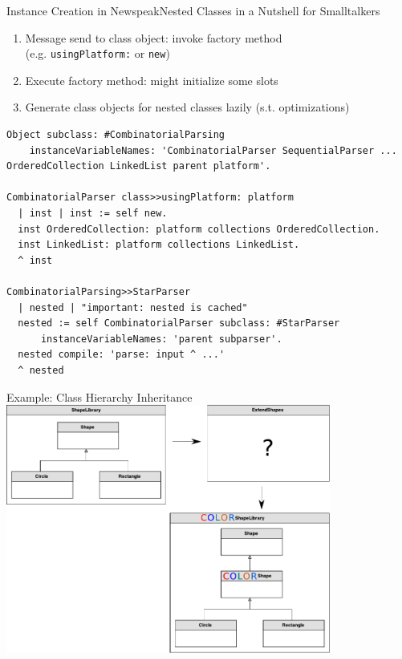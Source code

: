 \documentclass[xcolor=dvipsname, handout]{beamer} %
\begin{document}
\begin{frame}[fragile]{Instance Creation in Newspeak}{Nested Classes in a Nutshell for Smalltalkers}
\begin{enumerate}
  \item Message send to class object: invoke factory method \\ (e.g. \texttt{usingPlatform:} or \texttt{new})
  \item Execute factory method: might initialize some slots
  \item Generate class objects for nested classes lazily (s.t. optimizations)
\end{enumerate}

\begin{lstlisting}
Object subclass: #CombinatorialParsing
    instanceVariableNames: 'CombinatorialParser SequentialParser ... OrderedCollection LinkedList parent platform'.

CombinatorialParser class>>usingPlatform: platform
  | inst | inst := self new.
  inst OrderedCollection: platform collections OrderedCollection.
  inst LinkedList: platform collections LinkedList.
  ^ inst

CombinatorialParsing>>StarParser
  | nested | "important: nested is cached"
  nested := self CombinatorialParser subclass: #StarParser 
      instanceVariableNames: 'parent subparser'.
  nested compile: 'parse: input ^ ...'
  ^ nested
\end{lstlisting}
\end{frame}

\begin{frame}{Example: Class Hierarchy Inheritance}
\centering
\includegraphics[width=0.8\textwidth]{resources/newspeak_inheritance_challenge.pdf}
\end{frame}
\end{document}
